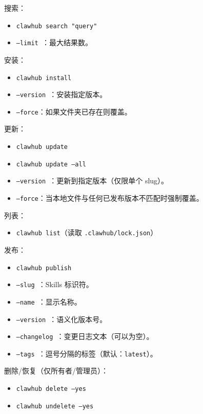 搜索：

\begin{itemize}
  \item \texttt{clawhub search "query"}
  \item \texttt{--limit }：最大结果数。
\end{itemize}


安装：

\begin{itemize}
  \item \texttt{clawhub install }
  \item \texttt{--version }：安装指定版本。
  \item \texttt{--force}：如果文件夹已存在则覆盖。
\end{itemize}


更新：

\begin{itemize}
  \item \texttt{clawhub update }
  \item \texttt{clawhub update --all}
  \item \texttt{--version }：更新到指定版本（仅限单个 slug）。
  \item \texttt{--force}：当本地文件与任何已发布版本不匹配时强制覆盖。
\end{itemize}


列表：

\begin{itemize}
  \item \texttt{clawhub list}（读取 \texttt{.clawhub/lock.json}）
\end{itemize}


发布：

\begin{itemize}
  \item \texttt{clawhub publish }
  \item \texttt{--slug }：Skills 标识符。
  \item \texttt{--name }：显示名称。
  \item \texttt{--version }：语义化版本号。
  \item \texttt{--changelog }：变更日志文本（可以为空）。
  \item \texttt{--tags }：逗号分隔的标签（默认：\texttt{latest}）。
\end{itemize}


删除/恢复（仅所有者/管理员）：

\begin{itemize}
  \item \texttt{clawhub delete  --yes}
  \item \texttt{clawhub undelete  --yes}
\end{itemize}


